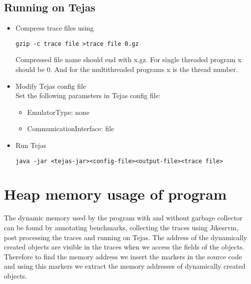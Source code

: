 \documentclass[a4paper]{article}
\begin{document}
\subsection{Running on Tejas}
\begin{itemize}
\item Compress trace files using
\begin{verbatim}
gzip -c trace file >trace file 0.gz
\end{verbatim}
Compressed file name should end with x.gz. For single threaded program x should be
0. And for the multithreaded programs x is the thread number.
\item Modify Tejas config file\\
Set the following parameters in Tejas config file:
\begin{itemize}
\item EmulatorType: none
\item CommunicationInterface: file
\end{itemize}
\item Run Tejas
\begin{verbatim}
java -jar <tejas-jar><config-file><output-file><trace file>
\end{verbatim}
\end{itemize}

\section{ Heap memory usage of program}
The dynamic memory used by the program with and without garbage collector can be found
by annotating benchmarks, collecting the traces using Jikesrvm, post processing the traces
and running on Tejas.
The address of the dynamically created objects are visible in the traces when we access the fields of the objects. Therefore to find the memory address we insert the markers in the source code and using this markers we extract the memory addresses of dynamically created objects.
\end{document}
